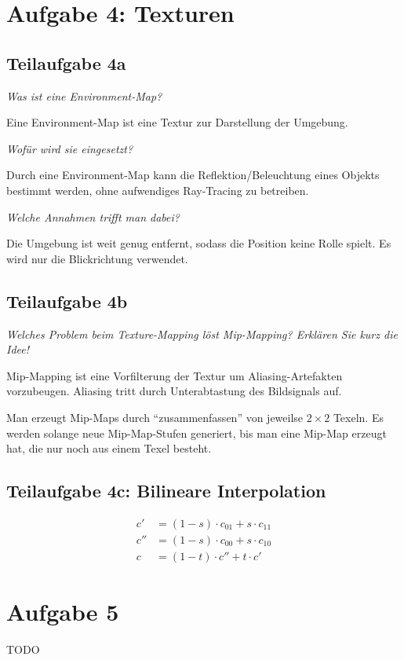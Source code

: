\documentclass[a4paper]{scrartcl}
\begin{document}
\section*{Aufgabe 4: Texturen}
\subsection*{Teilaufgabe 4a}
\textit{Was ist eine Environment-Map?}

Eine Environment-Map ist eine Textur zur Darstellung der Umgebung.

\textit{Wofür wird sie eingesetzt?}

Durch eine Environment-Map kann die Reflektion/Beleuchtung eines Objekts
bestimmt werden, ohne aufwendiges Ray-Tracing zu betreiben.

\textit{Welche Annahmen trifft man dabei?}

Die Umgebung ist weit genug entfernt, sodass die Position keine Rolle spielt.
Es wird nur die Blickrichtung verwendet.

\subsection*{Teilaufgabe 4b}
\textit{Welches Problem beim Texture-Mapping löst Mip-Mapping? Erklären Sie kurz die Idee!}

Mip-Mapping ist eine Vorfilterung der Textur um Aliasing-Artefakten vorzubeugen.
Aliasing tritt durch Unterabtastung des Bildsignals auf.

Man erzeugt Mip-Maps durch \enquote{zusammenfassen} von jeweilse $2 \times 2$
Texeln. Es werden solange neue Mip-Map-Stufen generiert, bis man eine Mip-Map
erzeugt hat, die nur noch aus einem Texel besteht.

\subsection*{Teilaufgabe 4c: Bilineare Interpolation}

\begin{align}
    c'  &= (1-s) \cdot c_{01} + s \cdot c_{11}\\
    c'' &= (1-s) \cdot c_{00} + s \cdot c_{10}\\
    c   &= (1-t) \cdot c'' + t \cdot c'
\end{align}

\section*{Aufgabe 5}
TODO
\end{document}
